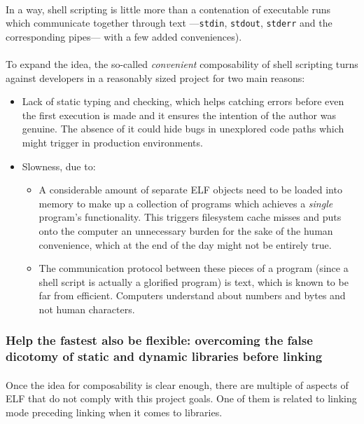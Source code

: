 \documentclass[12pt]{article}
\begin{document}
	\paragraph{}In a way, shell scripting is little more than a contenation of executable runs which communicate together through text ---\verb|stdin|, \verb|stdout|, \verb|stderr| and the corresponding pipes--- with a few added conveniences).
	\paragraph{}To expand the idea, the so-called \textit{convenient} composability of shell scripting turns against developers in a reasonably sized project for two main reasons:
	
	\begin{itemize}
		\item Lack of static typing and checking, which helps catching errors before even the first execution is made and it ensures the intention of the author was genuine. The absence of it could hide bugs in unexplored code paths which might trigger in production environments.
		\item Slowness, due to:
		\begin{itemize}
			\item A considerable amount of separate ELF objects need to be loaded into memory to make up a collection of programs which achieves a \textit{single} program's functionality. This triggers filesystem cache misses and puts onto the computer an unnecessary burden for the sake of the human convenience, which at the end of the day might not be entirely true.
			\item The communication protocol between these pieces of a program (since a shell script is actually a glorified program) is text, which is known to be far from efficient. Computers understand about numbers and bytes and not human characters.
		\end{itemize}
	\end{itemize}
	
	\subsubsection{Help the fastest also be flexible: overcoming the false dicotomy of static and dynamic libraries before linking}
	\paragraph{}Once the idea for composability is clear enough, there are multiple of aspects of ELF that do not comply with this project goals. One of them is related to linking mode preceding linking when it comes to libraries.
\end{document}
